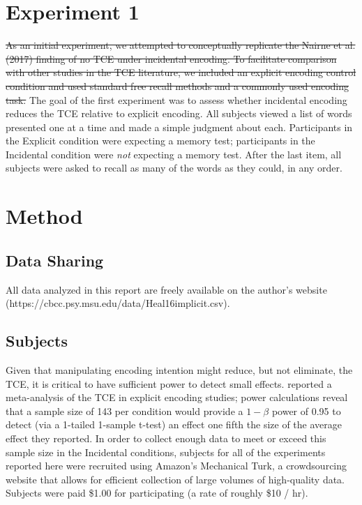 \documentclass[man,natbib,floatsintext]{apa6} %
\begin{document}
\section{Experiment 1}
\st{As an initial experiment, we attempted to conceptually replicate the Nairne et al. (2017) finding of no TCE under incidental encoding. To facilitate comparison with other studies in the TCE literature, we included an explicit encoding control condition and used standard free recall methods and a commonly used encoding task.}
\color{red}
The goal of the first experiment was to assess whether incidental encoding reduces the TCE relative to explicit encoding. All subjects viewed a list of words presented one at a time and made a simple judgment about each. Participants in the Explicit condition were expecting a memory test; participants in the Incidental condition were \emph{not} expecting a memory test.  After the last item, all subjects were asked to recall as many of the words as they could, in any order. 
\color{black}

\section{Method}

\newcommand\listlength{16} %
\newcommand\presrate{4 seconds} %
\newcommand\isi{1 second} %
\newcommand\DFRDelay{16 second} %
\newcommand\recalltime{75 seconds} %
\newcommand\totalss{XX}
\newcommand\totalexcluded{XX}



\subsection{Data Sharing}All data analyzed in this report are freely available on the author's website (https://cbcc.psy.msu.edu/data/Heal16implicit.csv).

\subsection{Subjects}

Given that manipulating encoding intention might reduce, but not eliminate, the TCE, it is critical to have sufficient power to detect small effects. \citet{SedeEtal10} reported a meta-analysis of the TCE in explicit encoding studies; power calculations reveal that a sample size of 143 per condition would provide a $1-\beta$ power of 0.95 to detect (via a 1-tailed 1-sample t-test) an effect one fifth the size of the average effect they reported. 
In order to collect enough data to meet or exceed this sample size in the Incidental conditions, subjects for all of the experiments reported here were recruited using Amazon's Mechanical Turk, a crowdsourcing website that allows for efficient collection of large volumes of high-quality data. Subjects were paid \$1.00 for participating (a rate of roughly \$10 / hr). 
\end{document}
